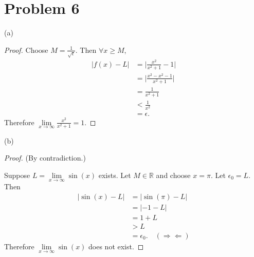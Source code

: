 \documentclass{article}
\newcommand{\R}{\mathbb{R}} %
\begin{document}
\section*{Problem 6}
(a) \begin{proof}
	Choose $M = \frac{1}{\sqrt{\epsilon}}$. Then $\forall x \geq M$, 
	\begin{align}
		|f(x) - L| &= \Big|\frac{x^2}{x^2 + 1} - 1\Big| \\
		&= \Big|\frac{x^2 - x^2 - 1}{x^2 + 1}\Big| \\
		&= \frac{1}{x^2 + 1} \\
		&< \frac{1}{x^2} \\
		&= \epsilon.
	\end{align}
	Therefore $\lim\limits_{x \to \infty} \frac{x^2}{x^2 + 1} = 1$.
\end{proof}

(b) \begin{proof}
	(By contradiction.)
	
	Suppose $L = \lim\limits_{x \to \infty} \sin(x)$ exists. Let $M \in \R$ and choose $x = \pi$. Let $\epsilon_0 = L$. Then
	\begin{align}
		|\sin(x) - L| &= |\sin(\pi) - L| \\
		&= |-1 - L| \\
		&= 1 + L \\
		&> L \\
		&= \epsilon_0. \quad (\Rightarrow \Leftarrow)
	\end{align}
	Therefore $\lim\limits_{x \to \infty} \sin(x)$ does not exist.
\end{proof}
\end{document}
